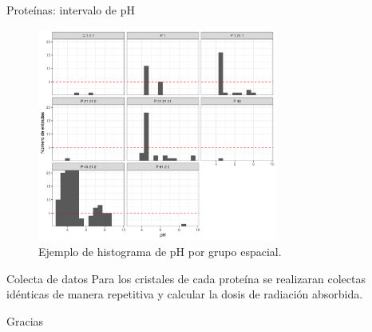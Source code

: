 \documentclass{beamer}
\begin{document}
\begin{frame}{Proteínas: intervalo de pH}
 \begin{figure}
 \centering
 \includegraphics[width=0.7\textwidth]{Images/hist_pH_by_gpo_P00698}
 \caption{Ejemplo de histograma de pH por grupo espacial.}
 \end{figure} 
\end{frame}
\begin{frame}{Colecta de datos}
Para los cristales de cada proteína se realizaran colectas idénticas de manera repetitiva y calcular la dosis de radiación absorbida.
\end{frame}
\begin{frame}
\centering
Gracias
\end{frame}
\end{document}
